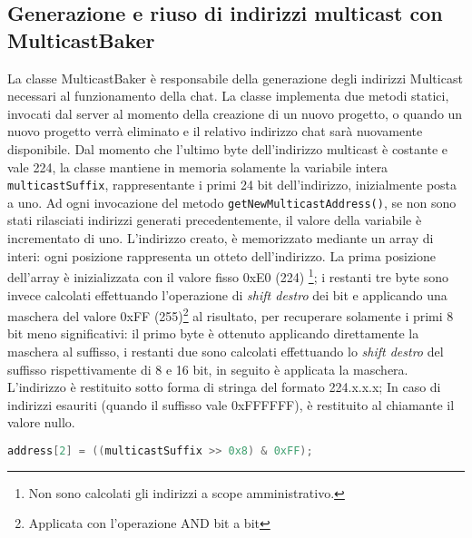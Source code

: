 \documentclass{article}
\begin{document}
\subsection{Generazione e riuso di indirizzi multicast con MulticastBaker}
La classe MulticastBaker è responsabile della generazione degli indirizzi Multicast necessari al funzionamento della chat. La classe implementa due metodi statici, invocati dal server al momento della creazione di un nuovo progetto, o quando un nuovo progetto verrà eliminato e il relativo indirizzo chat sarà nuovamente disponibile.
Dal momento che l'ultimo byte dell'indirizzo multicast è costante e vale 224, la classe mantiene in memoria solamente la variabile intera \texttt{multicastSuffix}, rappresentante i primi 24 bit dell'indirizzo, inizialmente posta a uno. Ad ogni invocazione del metodo \texttt{getNewMulticastAddress()}, se non sono stati rilasciati indirizzi generati precedentemente, il valore della variabile è incrementato di uno. L'indirizzo creato, è memorizzato mediante un array di interi: ogni posizione rappresenta un otteto dell'indirizzo. La prima posizione dell'array è inizializzata con il valore fisso 0xE0 (224)
\footnote{Non sono calcolati gli indirizzi a scope amministrativo.}; i restanti tre byte sono invece calcolati effettuando l'operazione di \emph{shift destro} dei bit e applicando una maschera del valore 0xFF (255)\footnote{Applicata con l'operazione AND bit a bit} al risultato, per recuperare solamente i primi 8 bit meno significativi: il primo byte è ottenuto applicando direttamente la maschera al suffisso, i restanti due sono calcolati effettuando lo \emph{shift destro} del suffisso rispettivamente di 8 e 16 bit, in seguito è applicata la maschera. L'indirizzo è restituito sotto forma di stringa del formato 224.x.x.x;
In caso di indirizzi esauriti (quando il suffisso vale 0xFFFFFF), è restituito al chiamante il valore nullo.\newline
\begin{lstlisting}[language=Java, caption=Inizializzazione del secondo byte dell'indirizzo]
    address[2] = ((multicastSuffix >> 0x8) & 0xFF); 
\end{lstlisting}
\end{document}

